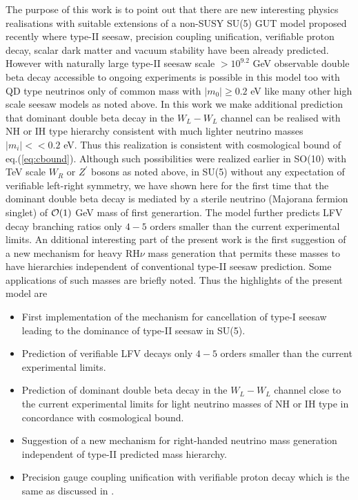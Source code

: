 \documentclass[a4paper,11pt]{article}
\begin{document}
The purpose of this work is to point out that there are new
interesting physics realisations with suitable
extensions of a non-SUSY SU(5) GUT model proposed recently \cite{scp:2018} where
type-II seesaw, precision coupling unification, verifiable proton
decay, scalar dark matter and vacuum stability have been already
predicted. However with naturally large type-II seesaw scale $> 10^{9.2}$ GeV observable double beta
decay accessible to ongoing experiments
\cite{bbexpt1-Klapdoor,bbexpt2,bbexpt3} is possible in this model
too with QD type neutrinos only of
common mass
with $|m_0| \ge 0.2$ eV like many other high scale seesaw models as noted above.
In this work we 
make additional prediction that dominant double beta decay in the
$W_L-W_L$ channel  can be realised with NH or IH type
hierarchy consistent with much lighter neutrino masses $|m_{i}|<< 0.2$
eV. Thus this realization is  consistent with
cosmological bound of eq.(\ref{eq:cbound}). Although such possibilities were realized earlier
in SO(10) with TeV scale $W_R$ or $Z^{\prime}$ bosons as noted above,
in SU(5) without any expectation of verifiable left-right symmetry, we have shown here for the first time that 
 the dominant double beta decay is mediated by a
sterile neutrino (Majorana fermion singlet) of ${\cal O}(1)$ GeV mass
of first generartion. The model further predicts LFV decay branching
ratios only $4-5$ orders smaller than the current experimental limits.
An dditional interesting part of the present work is the first suggestion of a new
mechanism for heavy RH$\nu$ mass generation that
permits these masses to have hierarchies independent of conventional
type-II seesaw prediction. Some applications of such masses are
briefly noted. Thus the highlights of the present model are
\begin{itemize}
\item{First implementation of the mechanism for cancellation of type-I seesaw leading to the dominance of type-II seesaw in SU(5).}
\item{Prediction of verifiable LFV decays only $4-5$ orders smaller
  than the current experimental limits.}
\item{Prediction of dominant double beta decay in the $W_L-W_L$
  channel close to the current experimental limits for light neutrino
  masses of NH or IH type in concordance  with cosmological bound.}
\item{Suggestion  of a new mechanism for right-handed neutrino mass generation
independent of type-II predicted mass hierarchy.} 
\item{Precision gauge coupling unification with verifiable proton
  decay which is the same as discussed in \cite{scp:2018}.}
\end{itemize}
\end{document}

